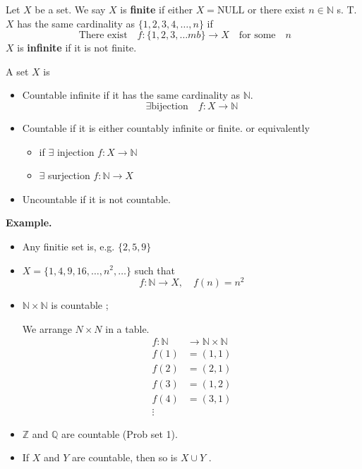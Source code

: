 \documentclass{article}
\theoremstyle{remark}
\begin{document}
\begin{definition}
  Let $X$ be a set. We say $X$ is \textbf{finite} if either $X = \text{NULL} $ or there exist $n \in \mathbb{N} $ s. T. $X$ has the same cardinality as $\{ 1,2,3,4, \ldots, n\} $ if \[
 \text{ There exist} \quad  f: \{1,2,3, \ldots m b\}  \to X \quad \text{for some} \quad  n    
  \] 
  $X$ is \textbf{infinite }  if it is not finite.
\end{definition}

\newpage 
\begin{definition}
  A set $X$ is 
  \begin{itemize}
    \item Countable infinite if it has the same cardinality as $\mathbb{N} $. \[
    \exists \text{bijection} \quad  f: X \to \mathbb{N}  
    \] 
  \item Countable if it is either countably infinite or finite. or equivalently 
    \begin{itemize}
      \item if $\exists$ injection $f: X \to \mathbb{N} $ 
      \item $\exists$ surjection $f: \mathbb{N}  \to X$
    \end{itemize}
  \item Uncountable if it is not countable.
  \end{itemize}
\end{definition}

\begin{tcolorbox}
  \textbf{Example.} 
  \begin{itemize}
    \item Any finitie set is, e.g. $\{ 2,5,9\} $ 
    \item $X = \{ 1,4,9,16, \ldots , n^2 , \ldots\} $  such that \[
    f: \mathbb{N}  \to X, \quad  f\left( n \right) = n^2 
    \] 
  \item $\mathbb{N} \times  \mathbb{N}  $ is countable ; \par
    We arrange $N\times N $ in a table. \[
    \begin{split}
         f: \mathbb{N}  &\to \mathbb{N} \times  \mathbb{N}  \\
        f\left( 1 \right) &=  \left( 1,1 \right) \\
        f\left( 2 \right) &=  \left(2,1  \right)  \\
        f\left( 3 \right) &=  \left( 1,2 \right) \\
        f\left( 4 \right) &=  \left( 3,1 \right) \\
        \vdots   
    \end{split} 
    \]  
  \item $\mathbb{Z} $ and $\mathbb{Q} $ are countable (Prob set 1).
  \item If $X$ and $Y$ are countable, then so is $X \cup  Y$ .
  \end{itemize}
\end{tcolorbox}
\end{document}
